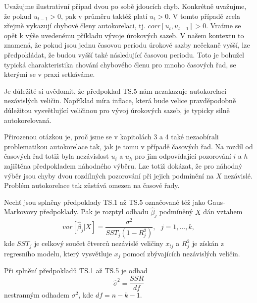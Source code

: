 Uvažujme ilustrativní případ dvou po sobě jdoucích chyb. 
Konkrétně uvažujme, že pokud $u_{t-1} > 0$, 
pak v průměru taktéž platí $u_t > 0$. V tomto případě zcela 
zřejmě vykazují chybové členy autokorelaci, tj. $corr[u_t, u_{t - 
1}] > 0$. Vraťme se opět k výše uvedenému příkladu vývoje 
úrokových sazeb. V našem kontextu to znamená, že pokud jsou jednu 
časovou periodu úrokové sazby nečekaně vyšší, lze 
předpokládat, že budou vyšší také následující časovou 
periodu. Toto je bohužel typická charakteristika chování chybového 
členu pro mnoho časových řad, se kterými se v praxi setkáváme.

Je důležité si uvědomit, že předpoklad TS.5 nám nezakazuje 
autokorelaci nezávislých veličin. Například míra inflace, která 
bude velice pravděpodobně důležitou vysvětlující veličinou pro 
vývoj úrokových sazeb, je typicky silně autokorelovaná.

Přirozenou otázkou je, proč jsme se v kapitolách 3 a 4 také nezaobírali 
problematikou autokorelace tak, jak je tomu v případě časových 
řad. Na rozdíl od časových řad totiž byla nezávislost $u_i$
 a $u_h$ pro jim odpovídající pozorování $i$ a $h$ zajištěna 
 předpokladem náhodného výběru. Lze totiž dokázat, že pro 
 náhodný výběr jsou chyby dvou rozdílných pozorování při 
 jejich podmínění na $X$ nezávislé. Problém autokorelace tak 
 zůstává omezen na časové řady.

\begin{theorem}
Nechť jsou splněny předpoklady TS.1 až TS.5 označované též jako 
Gaus-Markovovy předpoklady. Pak je rozptyl odhadu $\hat{\beta}_j$ 
podmíněný $X$ dán vztahem
\begin{equation}
var[\hat{\beta}_j | X] = \frac{\sigma^2}{SST_j(1 - R^2_j)}, ~~~ j = 1, 
..., k,
\end{equation}
kde $SST_j$ je celkový součet čtverců nezávislé veličiny 
$x_{tj}$ a $R^2_j$ je získán z regresního modelu, 
který vysvětluje $x_j$ pomocí zbývajících nezávislých veličin.

\raggedleft{$\clubsuit$}
\end{theorem}

\begin{theorem}
Při splnění předpokladů TS.1 až TS.5 je odhad
\begin{equation}
\hat{\sigma}^2 = \frac{SSR}{df}
\end{equation}
nestranným odhadem $\sigma^2$, kde $df = n - k - 1$.

\raggedleft{$\clubsuit$}
\end{theorem}

